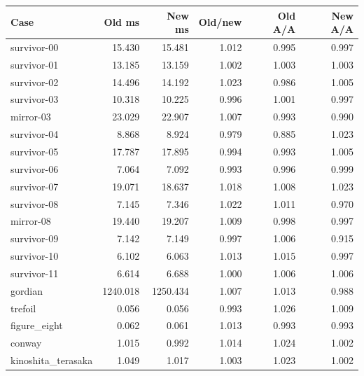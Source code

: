 \begin{center}\small
\begin{tabular}{lrrrrr}
\toprule
Case & Old ms & New ms & Old/new & Old A/A & New A/A \\
\midrule
survivor-00 & 15.430 & 15.481 & 1.012 & 0.995 & 0.997 \\
survivor-01 & 13.185 & 13.159 & 1.002 & 1.003 & 1.003 \\
survivor-02 & 14.496 & 14.192 & 1.023 & 0.986 & 1.005 \\
survivor-03 & 10.318 & 10.225 & 0.996 & 1.001 & 0.997 \\
mirror-03 & 23.029 & 22.907 & 1.007 & 0.993 & 0.990 \\
survivor-04 & 8.868 & 8.924 & 0.979 & 0.885 & 1.023 \\
survivor-05 & 17.787 & 17.895 & 0.994 & 0.993 & 1.005 \\
survivor-06 & 7.064 & 7.092 & 0.993 & 0.996 & 0.999 \\
survivor-07 & 19.071 & 18.637 & 1.018 & 1.008 & 1.023 \\
survivor-08 & 7.145 & 7.346 & 1.022 & 1.011 & 0.970 \\
mirror-08 & 19.440 & 19.207 & 1.009 & 0.998 & 0.997 \\
survivor-09 & 7.142 & 7.149 & 0.997 & 1.006 & 0.915 \\
survivor-10 & 6.102 & 6.063 & 1.013 & 1.015 & 0.997 \\
survivor-11 & 6.614 & 6.688 & 1.000 & 1.006 & 1.006 \\
gordian & 1240.018 & 1250.434 & 1.007 & 1.013 & 0.988 \\
trefoil & 0.056 & 0.056 & 0.993 & 1.026 & 1.009 \\
figure\_eight & 0.062 & 0.061 & 1.013 & 0.993 & 0.993 \\
conway & 1.015 & 0.992 & 1.014 & 1.024 & 1.002 \\
kinoshita\_terasaka & 1.049 & 1.017 & 1.003 & 1.023 & 1.002 \\
\bottomrule
\end{tabular}
\end{center}
